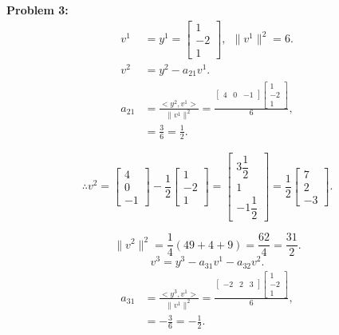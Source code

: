 \documentclass[letterpaper]{article}
\begin{document}
\noindent \textbf{Problem  3:}
$$\begin{aligned} v^1 &= y^1 = \begin{bmatrix} 1\\ -2\\ 1\end{bmatrix}, ~~\|v^1\|^2 = 6.\\
v^2 &= y^2 - a_{21} v^1.\\
a_{21} &= \frac{<y^2, v^1>}{\|v^1\|^2} = \frac{\left[\begin{array}{ccc} 4& 0& -1\end{array}\right]\begin{bmatrix} 1\\ -2\\ 1\end{bmatrix}}{6},\\
&=\frac{3}{6} = \frac{1}{2}.\end{aligned}$$

$$\therefore v^2 = \begin{bmatrix} 4\\0\\-1\end{bmatrix}-\frac{1}{2}\begin{bmatrix} 1\\-2\\1\end{bmatrix}=\begin{bmatrix}3\dfrac{1}{2}\\[2ex]1\\[2ex]-1\dfrac{1}{2}\end{bmatrix}=\frac{1}{2}\begin{bmatrix}7\\2\\-3\end{bmatrix}.$$

$$\|v^2\|^2 = \frac{1}{4} (49+4+9) = \frac{62}{4} = \frac{31}{2}.$$
\medskip
$$v^3 = y^3 - a_{31}v^1-a_{32}v^2.$$
$$\begin{aligned} a_{31} &= \frac{<y^3, v^1>}{\|v^1\|^2} = \frac{\left[\begin{array}{ccc} -2& 2& 3\end{array}\right]\begin{bmatrix} 1\\ -2\\ 1\end{bmatrix}}{6},\\
&= -\frac{3}{6} = -\frac{1}{2}. \end{aligned}$$
\end{document}
